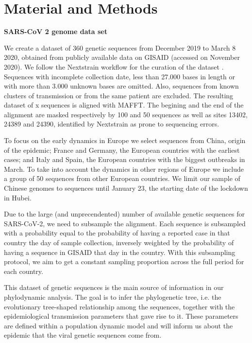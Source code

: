 \chapter{Material and Methods}

\textbf{SARS-CoV 2 genome data set}

We create a dataset of 360 genetic sequences from December 2019 to March 8 2020, obtained from publicly available data on GISAID \cite{gisaid} (accessed on November 2020). We follow the Nextstrain workflow for the curation of the dataset \cite{nextstrain}. Sequences with incomplete collection date, less than 27.000 bases in length or with more than 3.000 unknown bases are omitted. Also, sequences from known clusters of transmission or from the same patient are excluded. The resulting dataset of x  sequences is aligned with MAFFT. The begining and the end of the alignment are masked respectively by 100 and 50 sequences as well as sites  13402, 24389 and 24390, identified by Nextstrain as prone to sequencing errors.

To focus on the early dynamics in Europe we select sequences from China, origin of the epidemic; France and Germany, the European countries with the earliest cases; and Italy and Spain, the European countries with the biggest outbreaks in March. To take into account the dynamics in other regions of Europe we include a group of 50 sequences from other European countries. We limit our sample of Chinese genomes to sequences until January 23, the starting date of the lockdown in Hubei. 

Due to the large (and unprecendented) number of available genetic sequences for SARS-CoV-2, we need to subsample the alignment. Each sequence is subsampled with a probability equal to the probability of having a reported case in that country the day of sample collection, inversely weighted by the probability of having a sequence in GISAID that day in the country. With this subsampling protocol, we aim to get a constant sampling proportion across the full period for each country. 

This dataset of genetic sequences is the main source of information in our phylodynamic analysis. The goal is to infer the phylogenetic tree, i.e. the evolutionary tree-shaped relationship among the sequences, together with the epidemiological transmission parameters that gave rise to it. These parameters are defined within a population dynamic model and will inform us about the epidemic that the viral genetic sequences come from.

